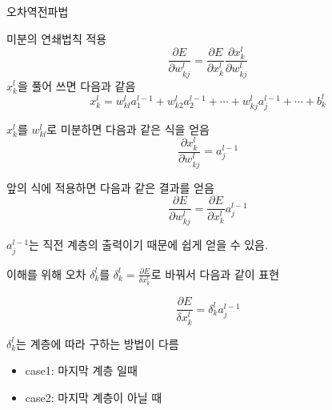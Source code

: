 \documentclass[10pt,t]{beamer}
\begin{document}
\begin{frame}{오차역전파법}
\begin{center}
\end{center}


\pagebreak

미분의 연쇄법칙 적용
\[\frac{\partial E}{\partial w_{kj}^l} = \frac{\partial E}{\partial x_k^l}\frac{\partial x_k^l}{\partial w_{kj}^l}\]
$x_k^l$을 풀어 쓰면 다음과 같음
\[x_k^l = w_{kl}^l a_1^{l-1} + w_{k2}^l a_2^{l-1} + \cdots  + w_{kj}^la_j^{l-1} + \cdots + b_k^l\]

$x_k^l$를 $w_{kl}^l$로 미분하면 다음과 같은 식을 얻음
\[\frac{\partial x_k^l}{\partial w_{kj}^l} = a_j^{l-1}\]

앞의 식에 적용하면 다음과 같은 결과를 얻음
\[\frac{\partial E}{\partial w_{kj}^l} = \frac{\partial E}{\partial x_k^l} a_j^{l-1} \]

$a_j^{l-1}$는 직전 계층의 출력이기 때문에 쉽게 얻을 수 있음. 

이해를 위해 오차 $\delta_k^l$를 $\delta_k^l=\frac{\partial E}{\delta x_k^l}$로 바꿔서 다음과 같이 표현

\[ \frac{\partial E}{\delta x_k^l} = \delta_k^l a_j^{l-1}\]

$\delta_k^l$는 계층에 따라 구하는 방법이 다름
\begin{itemize}
    \item case1: 마지막 계층 일때
    \item case2: 마지막 계층이 아닐 때
\end{itemize}
\end{frame}
\end{document}
